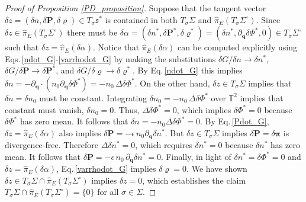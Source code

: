 \documentclass[10pt,a4paper]{amsart}
\begin{document}
\begin{proof}[Proof of Proposition \ref{PD_proposition}]
Suppose that the tangent vector $\delta z =(\delta n,\delta\bm{P},\delta\varrho) \in T_\sigma\mathfrak{s}^*$ is contained in both $T_\sigma\Sigma$ and $\widehat{\pi}_E(T_\sigma\Sigma^\circ)$. Since $\delta z\in \widehat{\pi}_E(T_\sigma\Sigma^\circ)$ there must be $\delta\alpha=(\delta n^*,\delta\bm{P}^*,\delta\varrho^*) = (\delta n^*,\partial_{\bm{q}}\delta\Phi^*,0)\in T_\sigma\Sigma^\circ$ such that $\delta z = \widehat{\pi}_E(\delta \alpha)$. Notice that $\widehat{\pi}_E(\delta \alpha)$ can be computed explicitly using Eqs.\,\eqref{ndot_G}-\eqref{varrhodot_G} by making the substitutions $\delta G/\delta n \rightarrow \delta n^*$, $\delta G/\delta\bm{P} \rightarrow \delta\bm{P}^*$, and $\delta G/\delta\varrho \rightarrow \delta\varrho^*$. By Eq.\,\eqref{ndot_G} this implies $\delta n = -\partial_{\bm{q}}\cdot(n_0\partial_{\bm{q}}\delta\Phi^*) = - n_0\,\Delta\delta\Phi^*$. On the other hand, $\delta z\in T_\sigma \Sigma$ implies that $\delta n = \delta n_0$ must be constant. Integrating $\delta n_0 = - n_0\,\Delta \delta\Phi^*$ over $\mathbb{T}^2$ implies that constant must vanish, $\delta n_0 = 0$. Thus, $\Delta \delta\Phi^* = 0$, which implies $\delta\Phi^* = 0$ because $\delta\Phi^*$ has zero mean. It follows that $\delta n = -n_0\Delta\delta\Phi^* = 0$. By Eq.\,\eqref{Pdot_G}, $\delta z = \widehat{\pi}_E(\delta\alpha)$ also implies $\delta\bm{P} = -\epsilon\,n_0\partial_{\bm{q}}\delta n^*$. But $\delta z\in T_\sigma\Sigma$ implies $\delta\bm{P} = \delta\bm{\pi}$ is divergence-free. Therefore $\Delta \delta n^* = 0$, which requires $\delta n^* = 0$ because $\delta n^*$ has zero mean. It follows that $\delta\bm{P} = - \epsilon\,n_0\,\partial_{\bm{q}}\delta n^* = 0$. Finally, in light of $\delta n^* = \delta\Phi^* = 0$ and $\delta z = \widehat{\pi}_E(\delta\alpha)$, Eq.\,\eqref{varrhodot_G} implies $\delta\varrho = 0$. We have shown $\delta z \in T_\sigma\Sigma\cap \widehat{\pi}_E(T_\sigma\Sigma^\circ)$ implies $\delta z = 0$, which establishes the claim $T_\sigma\Sigma\cap \widehat{\pi}_E(T_\sigma\Sigma^\circ) = \{0\}$ for all $\sigma\in\Sigma$.


\end{proof}
\end{document}
